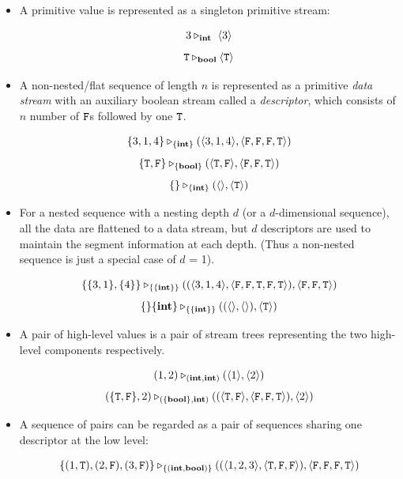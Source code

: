 \begin{itemize}
	\item A primitive value is represented as a singleton primitive stream: 
	\begin{example}
		$$3 \tr_\int \ \< 3 \'>$$
		$$ \mathtt{T} \triangleright_{\mathbf{bool}} \langle \mathtt{T} \rangle $$
	\end{example}
	
	
	\item A non-nested/flat sequence of length $n$ is represented as a primitive \emph{data stream} with an auxiliary boolean stream called a \emph{descriptor}, which consists of $n$ number of $\mathtt{F}$s followed by one $\mathtt{T}$. 
	\begin{example}
		$$\{3,1,4\} \tr_{\{\int\}} (\< 3,1,4 \'>, \< \F, \F,\F , \T \'>) $$
		$$\{\T,\F\} \tr_{\{\bool\}} (\< \T,\F\'>, \< \F,\F , \T \'>) $$
		$$\{\} \triangleright_{\{\mathbf{int} \}} (\langle \rangle, \langle \mathtt{T} \rangle)$$
	\end{example}
	
	\item For a nested sequence with a nesting depth $d$ (or a $d$-dimensional sequence), all the data are flattened to a data stream, but $d$ descriptors are used to maintain the segment information at each depth. 
	(Thus a non-nested sequence is just a special case of $d$ = 1).
	
	\begin{example}
		$$\{\{3,1\}, \{4\}\} \tr_{\{\{\int\}\}} ((\< 3,1,4 \'>, \<\F,\F,\T,\F,\T \'>),\< \F, \F, \T \'>)  $$		
		$$\{\}\{\mathbf{int}\} \triangleright_{\{\{\mathbf{int}\}\}} ((\langle \rangle, \langle \rangle), \langle \mathtt{T} \rangle)$$
	\end{example}

	
	\item A pair of high-level values is a pair of stream trees representing the two high-level components respectively.  
	\begin{example}
		$$(1,2) \triangleright_{(\mathbf{int},\mathbf{int})} (\langle 1 \rangle, \langle 2 \rangle)$$
		$$(\{\T,\F\},2) \tr_{(\{\bool\},\int)} ((\< \T, \F \'>, \< \F,\F,\T \'>),\singl{2})$$
	\end{example} 
	
	\item A sequence of pairs can be regarded as a pair of sequences sharing one descriptor at the low level:
	\begin{example}
		$$\{(1,\T),(2,\F),(3,\F)\} \tr_{\{(\int,\bool)\}} ((\<1,2,3\'>, \<\T,\F, \F\'>), \< \F,\F,\F,\T \'>)$$
	\end{example}
	
	
\end{itemize}


